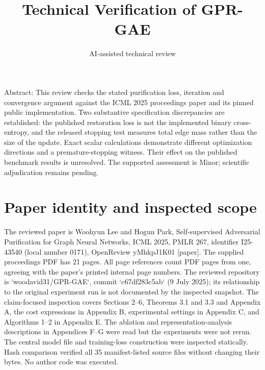 \documentclass[10pt]{article}
\title{Technical Verification of GPR-GAE}
\author{AI-assisted technical review}
\date{}
\begin{document}
\maketitle
Abstract: This review checks the stated purification loss, iteration and convergence argument against the ICML 2025 proceedings paper and its pinned public implementation. Two substantive specification discrepancies are established: the published restoration loss is not the implemented binary cross-entropy, and the released stopping test measures total edge mass rather than the size of the update. Exact scalar calculations demonstrate different optimization directions and a premature-stopping witness. Their effect on the published benchmark results is unresolved. The supported assessment is Minor; scientific adjudication remains pending.\par
\section*{Paper identity and inspected scope}
The reviewed paper is Woohyun Lee and Hogun Park, Self-supervised Adversarial Purification for Graph Neural Networks, ICML 2025, PMLR 267, identifier I25-43540 (local number 0171), OpenReview yMhkpJ1K01 [paper]. The supplied proceedings PDF has 21 pages. All page references count PDF pages from one, agreeing with the paper’s printed internal page numbers. The reviewed repository is `woodavid31/GPR-GAE`, commit `c67df283c5ab` (9 July 2025); its relationship to the original experiment run is not documented by the inspected snapshot. The claim-focused inspection covers Sections 2–6, Theorems 3.1 and 3.3 and Appendix A, the cost expressions in Appendix B, experimental settings in Appendix C, and Algorithms 1–2 in Appendix E. The ablation and representation-analysis descriptions in Appendices F–G were read but the experiments were not rerun. The central model file and training-loss construction were inspected statically. Hash comparison verified all 35 manifest-listed source files without changing their bytes. No author code was executed.\par
\end{document}
